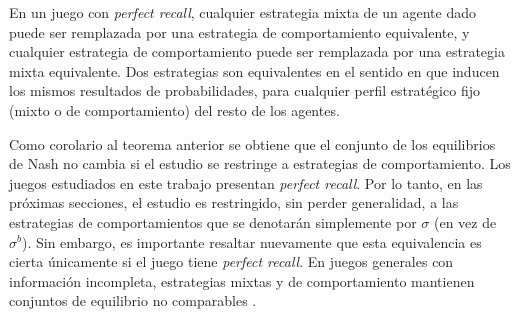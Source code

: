 \begin{theorem}
\label{theo:equivalencia-estrategias}
En un juego con \textit{perfect recall}, cualquier estrategia mixta de un agente dado puede ser remplazada por una estrategia de comportamiento equivalente, y cualquier estrategia de comportamiento puede ser remplazada por una estrategia mixta equivalente. Dos estrategias son equivalentes en el sentido en que inducen los mismos resultados de probabilidades, para cualquier perfil estratégico fijo (mixto o de comportamiento) del resto de los agentes.
\end{theorem}

Como corolario al teorema anterior se obtiene que el conjunto de los equilibrios de Nash no cambia si el estudio se restringe a estrategias de comportamiento. Los juegos estudiados en este trabajo presentan \textit{perfect recall}. Por lo tanto, en las próximas secciones, el estudio es restringido, sin perder generalidad, a las estrategias de comportamientos que se denotarán simplemente por $\sigma$ (en vez de $\sigma^b$). Sin embargo, es importante resaltar nuevamente que esta equivalencia es cierta únicamente si el juego tiene \textit{perfect recall}. En juegos generales con información incompleta, estrategias mixtas y de comportamiento mantienen conjuntos de equilibrio no comparables \cite[p.~45]{bib:handbook-blai}.
